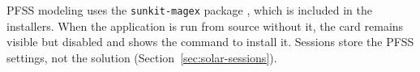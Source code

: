 
\begin{note}
  PFSS modeling uses the \texttt{sunkit-magex} package \parencite{stansby2020}, which is
  included in the installers. When the application is run from source without it, the card
  remains visible but disabled and shows the command to install it. Sessions store the PFSS
  settings, not the solution (Section~\ref{sec:solar-sessions}).
\end{note}
